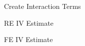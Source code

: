 Create Interaction Terms
\begin{stlog}\end{stlog}
RE IV Estimate
\begin{stlog}\end{stlog}
FE IV Estimate
\begin{stlog}\end{stlog}
